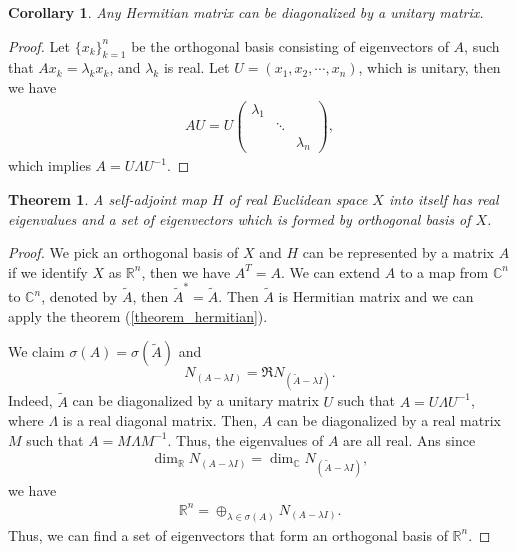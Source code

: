 \documentclass[11pt]{book}
\newtheorem{theorem}{Theorem}[section]
\newtheorem{corollary}{Corollary}[section]
\theoremstyle{definition}
\numberwithin{equation}{subsection}
\begin{document}
\medskip

\begin{corollary}
Any Hermitian matrix can be diagonalized by a unitary matrix.
\end{corollary}
\begin{proof}
Let $\{x_k\}^n_{k=1}$ be the orthogonal basis consisting of eigenvectors of $A$, such that $Ax_k = \lambda_k x_k$, and $\lambda_k$ is real. Let $U = (x_1, x_2,\cdots, x_n)$, which is unitary, then we have 
\begin{align*}
    AU = U \begin{pmatrix}
    \lambda_1 &  &  \\
     & \ddots  &  \\
     &   & \lambda_n
    \end{pmatrix},
\end{align*}
which implies $A = U\Lambda U^{-1}$.
\end{proof}

\medskip

\begin{theorem}\label{theorem_symmetric}
A self-adjoint map $H$ of real Euclidean space $X$ into itself has real eigenvalues and a set of eigenvectors which is formed by orthogonal basis of $X$.
\end{theorem}
\begin{proof}
We pick an orthogonal basis of $X$ and $H$ can be represented by a matrix $A$ if we identify $X$ as $\mathbb{R}^n$, then we have $A^T = A$. We can extend $A$ to a map from $\mathbb{C}^n$ to $\mathbb{C}^n$, denoted by $\widetilde{A}$, then $\widetilde{A}^* = \widetilde{A}$. Then $\widetilde{A}$ is Hermitian matrix and we can apply the theorem (\ref{theorem_hermitian}). 

We claim $\sigma(A) = \sigma \left(\widetilde{A}\right)$ and $$N_{(A - \lambda I)} = \Re N_{\left(\widetilde{A} - \lambda I\right)}.$$
Indeed, $\widetilde{A}$ can be diagonalized by a unitary matrix $U$ such that $A = U\Lambda U^{-1}$, where $\Lambda$ is a real diagonal matrix. Then, $A$ can be diagonalized by a real matrix $M$ such that $A = M\Lambda M^{-1}$. Thus, the eigenvalues of $A$ are all real. Ans since
\begin{align*}
    \dim_{\mathbb{R}} N_{(A - \lambda I)} = \dim_{\mathbb{C}} N_{\left(\widetilde{A} - \lambda I\right)},
\end{align*}
we have 
\begin{align*}
    \mathbb{R}^n = \oplus_{\lambda \in \sigma(A)} N_{(A - \lambda I)}.
\end{align*}
Thus, we can find a set of eigenvectors that form an orthogonal basis of $\mathbb{R}^n$.
\end{proof}
\end{document}

